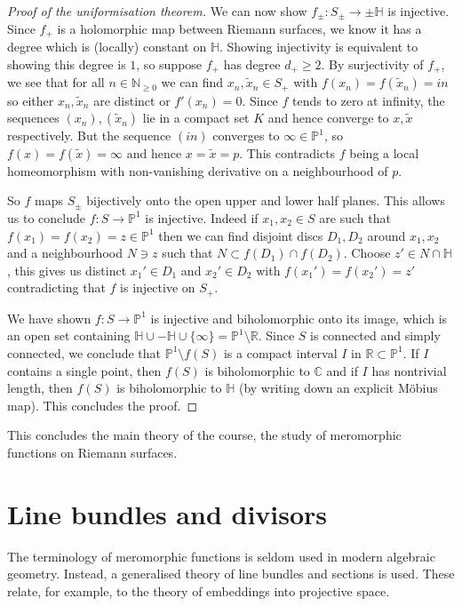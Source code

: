 \begin{proof}[Proof of the uniformisation theorem]
    We can now show \(f_\pm : S_\pm \to \pm\mathbb{H}\) is injective. Since
    \(f_+\) is a holomorphic map between Riemann surfaces, we know it has a
    degree which is (locally) constant on \(\mathbb{H}\). Showing injectivity is
    equivalent to showing this degree is \(1\), so suppose \(f_+\) has degree
    \(d_+\geq 2\). By surjectivity of \(f_+\), we see that for all \(n\in
    \mathbb{N}_{\geq 0}\) we can find \(x_n,\tilde{x}_n\in S_+\) with
    \(f(x_n)=f(\tilde{x}_n)=in\) so either \(x_n,\tilde{x}_n\) are distinct or
    \(f'(x_n)=0\). Since \(f\) tends to zero at infinity, the sequences
    \((x_n),(\tilde{x}_n)\) lie in a compact set \(K\) and hence converge to
    \(x,\tilde x\) respectively. But the sequence \((in)\) converges to
    \(\infty\in \mathbb{P}^1\), so \(f(x)=f(\tilde x)=\infty\) and hence
    \(x=\tilde x = p\). This contradicts \(f\) being a local homeomorphism with
    non-vanishing derivative on a neighbourhood of \(p\).

    So \(f\) maps \(S_{\pm}\) bijectively onto the open upper and lower half
    planes. This allows us to conclude \(f:S\to \mathbb{P}^1\) is injective.
    Indeed if \(x_1,x_2\in S\) are such that \(f(x_1)=f(x_2)=z\in \mathbb{P}^1\)
    then we can find disjoint discs \(D_1,D_2\) around \(x_1,x_2\) and a
    neighbourhood \(N\ni z\) such that \(N\subset f(D_1)\cap f(D_2)\). Choose
    \(z'\in N\cap \mathbb{H}\), this gives us distinct \(x_1'\in D_1\) and
    \(x_2'\in D_2\) with \(f(x_1')=f(x_2')=z'\) contradicting that \(f\) is
    injective on \(S_+\).

     We have shown \(f:S\to \mathbb{P}^1\) is injective and
    biholomorphic onto its image, which is an open set containing
    \(\mathbb{H}\cup -\mathbb{H} \cup \{\infty\}=\mathbb{P}^1\setminus
    \mathbb{R}\). Since \(S\) is connected and simply connected, we conclude
    that \(\mathbb{P}^1\setminus f(S)\) is a compact interval \(I\) in
    \(\mathbb{R}\subset \mathbb{P}^1\). If \(I\) contains a single point, then
    \(f(S)\) is biholomorphic to \(\mathbb{C}\) and if \(I\) has nontrivial
    length, then \(f(S)\) is biholomorphic to \(\mathbb{H}\) (by writing down
    an explicit M\"obius map). This concludes the proof.
\end{proof}
This concludes the main theory of the course, the study of meromorphic functions
on Riemann surfaces.

\section{Line bundles and divisors}
The terminology of meromorphic functions is seldom used in modern algebraic
geometry. Instead, a generalised theory of line bundles and sections is used.
These relate, for example, to the theory of embeddings into projective space.

